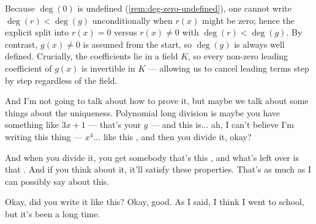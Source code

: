 \begin{content}

\begin{steps}
Because $\deg(0)$ is undefined (\cref{rem:deg-zero-undefined}), one cannot write $\deg(r) < \deg(g)$ unconditionally when $r(x)$ might be zero; hence the explicit split into $r(x) = 0$ versus $r(x) \neq 0$ with $\deg(r) < \deg(g)$. By contrast, $g(x) \neq 0$ is assumed from the start, so $\deg(g)$ is always well defined. Crucially, the coefficients lie in a field $K$, so every non-zero leading coefficient of $g(x)$ is invertible in $K$ --- allowing us to cancel leading terms step by step regardless of the field.
\end{steps}
\end{content}

\begin{speech}[00:28:16 - 00:28:55]
And I'm not going to talk about how to prove it, but maybe we talk about some things about the uniqueness. Polynomial long division is maybe you have something like $3x + 1$ --- that's your $g$ --- and this is... ah, I can't believe I'm writing this thing --- $x^4 \dots$ like this , and then you divide it, okay?

And when you divide it, you get somebody that's this , and what's left over is that . And if you think about it, it'll satisfy these properties. That's as much as I can possibly say about this.

Okay, did you write it like this?  Okay, good. As I said, I think I went to school, but it's been a long time.
\end{speech}

